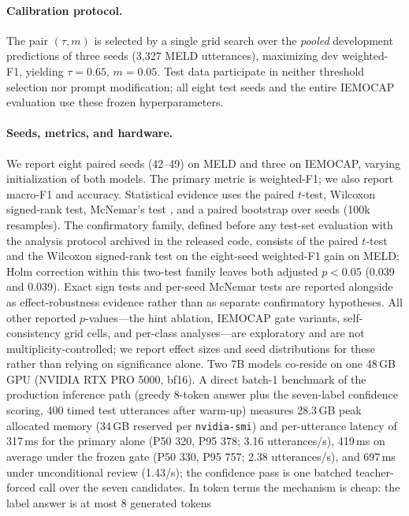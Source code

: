 \documentclass[final,5p,times,twocolumn]{elsarticle}
\begin{document}
\paragraph{Calibration protocol.}
The pair $(\tau,m)$ is selected by a single grid search over the
\emph{pooled} development predictions of three seeds (3{,}327 MELD
utterances), maximizing dev weighted-F1, yielding $\tau{=}0.65$, $m{=}0.05$.
Test data participate in neither threshold selection nor prompt modification;
all eight test seeds and the entire IEMOCAP evaluation use these frozen
hyperparameters.

\paragraph{Seeds, metrics, and hardware.}
We report eight paired seeds (42--49) on MELD and three on IEMOCAP, varying
initialization of both models. The primary metric is weighted-F1; we also
report macro-F1 and accuracy. Statistical evidence uses the paired $t$-test,
Wilcoxon signed-rank test, McNemar's test \citep{mcnemar1947note}, and a
paired bootstrap over seeds (100k resamples). The confirmatory family, defined before any test-set evaluation
with the analysis protocol archived in the released code, consists of the paired $t$-test and the Wilcoxon signed-rank test on
the eight-seed weighted-F1 gain on MELD; Holm correction within this
two-test family leaves both adjusted $p<0.05$ (0.039 and 0.039). Exact sign
tests and per-seed McNemar tests are reported alongside as effect-robustness
evidence rather than as separate confirmatory hypotheses. All other reported
$p$-values---the hint ablation, IEMOCAP gate
variants, self-consistency grid cells, and per-class analyses---are
exploratory and are not multiplicity-controlled; we report effect sizes and
seed distributions for these rather than relying on significance alone.
Two 7B models co-reside on one
48\,GB GPU (NVIDIA RTX PRO 5000, bf16). A direct batch-1 benchmark of the
production inference path (greedy 8-token answer plus the seven-label
confidence scoring, 400 timed test utterances after warm-up) measures
28.3\,GB peak allocated memory (34\,GB reserved per \texttt{nvidia-smi})
and per-utterance latency of 317\,ms for the primary alone (P50 320,
P95 378; 3.16 utterances/s), 419\,ms on average under the frozen gate
(P50 330, P95 757; 2.38 utterances/s), and 697\,ms under unconditional
review (1.43/s); the confidence pass is one batched teacher-forced call
over the seven candidates. In token terms the
mechanism is cheap: the label answer is at most 8 generated tokens
\end{document}
